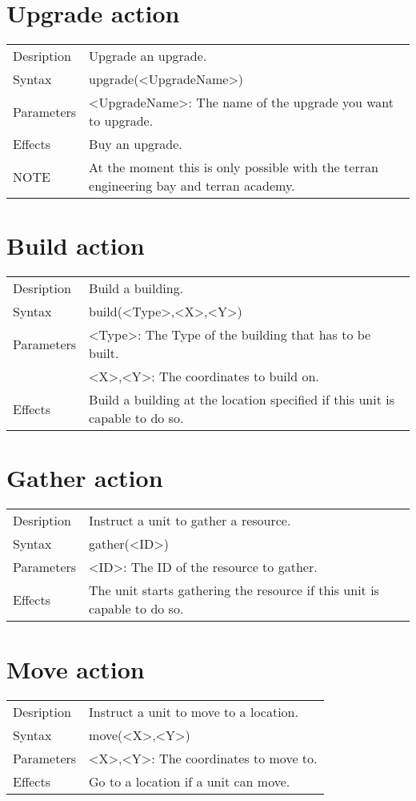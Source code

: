 \documentclass[english,11pt]{report}
\begin{document}
\section{Upgrade action}
\begin{tabularx}{\textwidth}{lX}
 Desription & Upgrade an upgrade. \\
 Syntax & upgrade(<UpgradeName>) \\
 Parameters & <UpgradeName>: The name of the upgrade you want to upgrade.\\
 Effects &  Buy an upgrade.\\
 NOTE & At the moment this is only possible with the terran engineering bay and terran academy.
\end{tabularx}

\section{Build action}
\begin{tabularx}{\textwidth}{lX}
 Desription & Build a building. \\
 Syntax & build(<Type>,<X>,<Y>) \\
 Parameters & <Type>: The Type of the building that has to be built.\\
            & <X>,<Y>: The coordinates to build on.\\
 Effects &  Build a building at the location specified if this unit is capable to do so.
\end{tabularx}

\section{Gather action}
\begin{tabularx}{\textwidth}{lX}
 Desription & Instruct a unit to gather a resource. \\
 Syntax & gather(<ID>) \\
 Parameters & <ID>: The ID of the resource to gather.\\
 Effects &  The unit starts gathering the resource if this unit is capable to do so.
\end{tabularx}

\section{Move action}
\begin{tabularx}{\textwidth}{lX}
 Desription & Instruct a unit to move to a location. \\
 Syntax & move(<X>,<Y>) \\
 Parameters & <X>,<Y>: The coordinates to move to.\\
 Effects &  Go to a location if a unit can move.
\end{tabularx}
\end{document}
